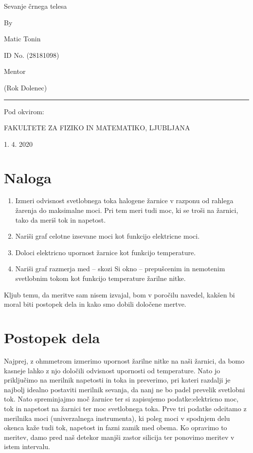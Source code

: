 \documentclass[11pt, a4paper]{article}
\theoremstyle{definition}
\theoremstyle{example}
\theoremstyle{izrek}
\begin{document}
\begin{center}
\thispagestyle{empty}
\parskip=14pt%
\vspace*{3\parskip}%
\begin{Huge} Sevanje črnega telesa \end{Huge}

By

Matic Tonin

ID No. (28181098)

Mentor 

(Rok Dolenec)

\rule{7cm}{0.4pt}

Pod okvirom:

FAKULTETE ZA FIZIKO IN MATEMATIKO, LJUBLJANA

1. 4. 2020

\end{center}
\pagebreak
\section{Naloga}
\begin{enumerate}
\item Izmeri odvisnost svetlobnega toka halogene žarnice v razponu od rahlega žarenja
do maksimalne moci. Pri tem meri tudi moc, ki se troši na žarnici, tako da meriš
tok in napetost.
\item Nariši graf celotne izsevane moci kot funkcijo elektricne moci.
\item Doloci elektricno upornost žarnice kot funkcijo temperature.
\item Nariši graf razmerja med – skozi Si okno – prepušcenim in nemotenim svetlobnim
tokom kot funkcijo temperature žarilne nitke.
\end{enumerate}

Kljub temu, da meritve sam nisem izvajal, bom v poročilu navedel, kakšen bi moral biti postopek dela in kako smo dobili določene mertve. \\
\bigskip
\section{Postopek dela}

Najprej, z ohmmetrom izmerimo upornost žarilne nitke na naši žarnici, da bomo kasneje lahko z njo določili odvisnost upornosti od temperature. Nato jo priključimo na merilnik napetosti in toka in preverimo, pri kateri razdalji je najbolj idealno postaviti merilnik sevanja, da nanj ne bo padel prevelik svetlobni tok. Nato spreminjajmo moč žarnice ter si zapisujemo podatke:elektricno moc, tok in napetost na žarnici ter
moc svetlobnega toka. Prve tri podatke odcitamo z merilnika moci (univerzalnega instrumenta),
ki poleg moci v spodnjem delu okenca kaže tudi tok, napetost in fazni zamik
med obema.
Ko opravimo to meritev, damo pred naš detekor manjši zastor silicija ter ponovimo meritev v istem intervalu. 
\end{document}
